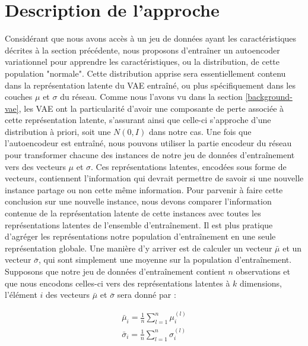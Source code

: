 \section{Description de l'approche}

Considérant que nous avons accès à un jeu de données ayant les caractéristiques décrites à la section précédente, nous proposons d'entraîner un autoencoder variationnel pour apprendre les caractéristiques, ou la distribution, de cette population "normale". Cette distribution apprise sera essentiellement contenu dans la représentation latente du VAE entraîné, ou plus spécifiquement dans les couches $\mu$ et $\sigma$ du réseau. Comme nous l'avons vu dans la section \ref{background-vae}, les VAE ont la particularité d'avoir une composante de perte associée à cette représentation latente, s'assurant ainsi que celle-ci s'approche d'une distribution à priori, soit une $N(0, I)$ dans notre cas. Une fois que l'autoencodeur est entraîné, nous pouvons utiliser la partie encodeur du réseau pour transformer chacune des instances de notre jeu de données d'entraînement vers des  vecteurs $\mu$ et $\sigma$. Ces représentations latentes, encodées sous forme de vecteurs, contiennent l'information qui devrait permettre de savoir si une nouvelle instance partage ou non cette même information. Pour parvenir à faire cette conclusion sur une nouvelle instance, nous devons comparer l'information contenue de la représentation latente de cette instances avec toutes les représentations latentes de l'ensemble d'entraînement. Il est plus pratique d'agréger les représentations notre population d'entraînement en une seule représentation globale. Une manière d'y arriver est de calculer un vecteur $\bar{\mu}$ et un vecteur $\bar{\sigma}$, qui sont simplement une moyenne sur la population d'entraînement. Supposons que notre jeu de données d'entraînement contient $n$ observations et que nous encodons celles-ci vers des représentations latentes à $k$ dimensions, l'élément $i$ des vecteurs $\bar{\mu}$ et $\bar{\sigma}$ sera donné par :

\begin{gather*}
\bar{\mu}_{i} = \frac{1}{n} \sum_{l=1}^{n} \mu_{i}^{(l)} \\
\bar{\sigma}_{i} = \frac{1}{n} \sum_{l=1}^{n} \sigma_{i}^{(l)}
\end{gather*}

